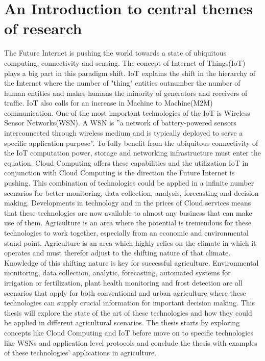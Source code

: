 \documentclass[]{uiophd}
\begin{document}
\section{An Introduction to central themes of research}
The Future Internet is pushing the world towards a state of ubiquitous computing, connectivity and sensing. The concept of Internet of Things(IoT) plays a big part in this paradigm shift. IoT explains the shift in the hierarchy of the Internet where the number of "thing" entities outnumber the number of human entities and makes humans the minority of generators and receivers of traffic. IoT also calls for an increase in Machine to Machine(M2M) communication. One of the most important technologies of the IoT is Wireless Sensor Networks(WSN). A WSN is ''a network of battery-powered sensors interconnected through wireless medium and is typically deployed to serve a specific application purpose''\cite{Ojha2015662}. To fully benefit from the ubiquitous connectivity of the IoT computation power, storage and networking infrastructure must enter the equation. Cloud Computing offers these capabilities and the utilization IoT in conjunction with Cloud Computing is the direction the Future Internet is pushing. This combination of technologies could be applied in a infinite number scenarios for better monitoring, data collection, analysis, forecasting and decision making. Developments in technology and in the prices of Cloud services means that these technologies are now available to almost any business that can make use of them. Agriculture is an area where the potential is tremendous for these technologies to work together, especially from an economic and environmental stand point. Agriculture is an area which highly relies on the climate in which it operates and must therefor adjust to the shifting nature of that climate. Knowledge of this shifting nature is key for successful agriculture. Environmental monitoring, data collection, analytic, forecasting, automated systems for irrigation or fertilization, plant health monitoring and frost detection are all scenarios that apply for both conventional and urban agriculture where these technologies can supply crucial information for important decision making. This thesis will explore the state of the art of these technologies and how they could be applied in different agricultural scenarios. The thesis starts by exploring concepts like Cloud Computing and IoT before move on to specific technologies like WSNs and application level protocols and conclude the thesis with examples of these technologies' applications in agriculture.
\end{document}
